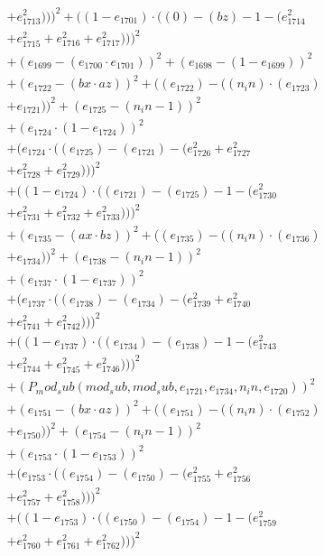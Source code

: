 \documentclass[10pt, a4paper]{article}
\begin{document}
\begin{align*}
& + e_{1713}^{2})))^{2} + ((1 - e_{1701})  \cdot  ((0) - (bz) - 1 - (e_{1714}^{2} \\
& + e_{1715}^{2} + e_{1716}^{2} + e_{1717}^{2})))^{2} \\
& + (e_{1699} - (e_{1700}  \cdot  e_{1701}))^{2} + (e_{1698} - (1 - e_{1699}))^{2} \\
& + (e_{1722} - (bx  \cdot  az))^{2} + ((e_{1722}) - ((n_in)  \cdot  (e_{1723}) \\
& + e_{1721}))^{2} + (e_{1725} - (n_in - 1))^{2} \\
& + (e_{1724}  \cdot  (1 - e_{1724}))^{2} \\
& + (e_{1724}  \cdot  ((e_{1725}) - (e_{1721}) - (e_{1726}^{2} + e_{1727}^{2} \\
& + e_{1728}^{2} + e_{1729}^{2})))^{2} \\
& + ((1 - e_{1724})  \cdot  ((e_{1721}) - (e_{1725}) - 1 - (e_{1730}^{2} \\
& + e_{1731}^{2} + e_{1732}^{2} + e_{1733}^{2})))^{2} \\
& + (e_{1735} - (ax  \cdot  bz))^{2} + ((e_{1735}) - ((n_in)  \cdot  (e_{1736}) \\
& + e_{1734}))^{2} + (e_{1738} - (n_in - 1))^{2} \\
& + (e_{1737}  \cdot  (1 - e_{1737}))^{2} \\
& + (e_{1737}  \cdot  ((e_{1738}) - (e_{1734}) - (e_{1739}^{2} + e_{1740}^{2} \\
& + e_{1741}^{2} + e_{1742}^{2})))^{2} \\
& + ((1 - e_{1737})  \cdot  ((e_{1734}) - (e_{1738}) - 1 - (e_{1743}^{2} \\
& + e_{1744}^{2} + e_{1745}^{2} + e_{1746}^{2})))^{2} \\
& + (P_mod_sub(mod_sub, mod_sub, e_{1721}, e_{1734}, n_in, e_{1720}))^{2} \\
& + (e_{1751} - (bx  \cdot  az))^{2} + ((e_{1751}) - ((n_in)  \cdot  (e_{1752}) \\
& + e_{1750}))^{2} + (e_{1754} - (n_in - 1))^{2} \\
& + (e_{1753}  \cdot  (1 - e_{1753}))^{2} \\
& + (e_{1753}  \cdot  ((e_{1754}) - (e_{1750}) - (e_{1755}^{2} + e_{1756}^{2} \\
& + e_{1757}^{2} + e_{1758}^{2})))^{2} \\
& + ((1 - e_{1753})  \cdot  ((e_{1750}) - (e_{1754}) - 1 - (e_{1759}^{2} \\
& + e_{1760}^{2} + e_{1761}^{2} + e_{1762}^{2})))^{2} \\

\end{align*}
\end{document}
